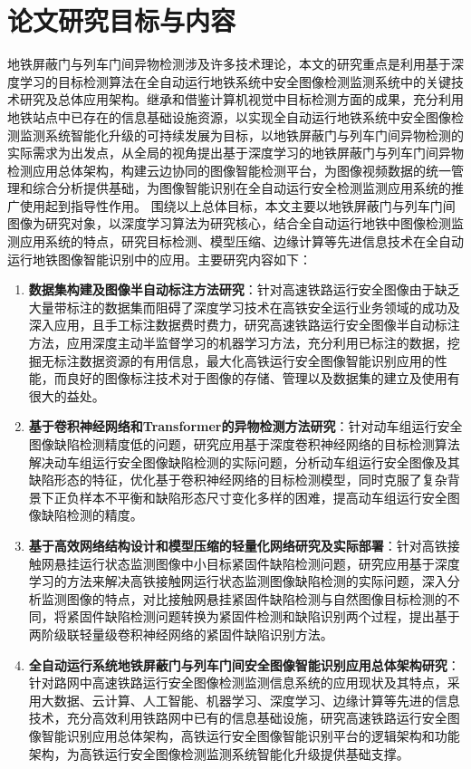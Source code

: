 \section{论文研究目标与内容}
地铁屏蔽门与列车门间异物检测涉及许多技术理论，本文的研究重点是利用基于深度学习的目标检测算法在全自动运行地铁系统中安全图像检测监测系统中的关键技术研究及总体应用架构。继承和借鉴计算机视觉中目标检测方面的成果，充分利用地铁站点中已存在的信息基础设施资源，以实现全自动运行地铁系统中安全图像检测监测系统智能化升级的可持续发展为目标，以地铁屏蔽门与列车门间异物检测的实际需求为出发点，从全局的视角提出基于深度学习的地铁屏蔽门与列车门间异物检测应用总体架构，构建云边协同的图像智能检测平台，为图像视频数据的统一管理和综合分析提供基础，为图像智能识别在全自动运行安全检测监测应用系统的推广使用起到指导性作用。 
围绕以上总体目标，本文主要以地铁屏蔽门与列车门间图像为研究对象，以深度学习算法为研究核心，结合全自动运行地铁中图像检测监测应用系统的特点，研究目标检测、模型压缩、边缘计算等先进信息技术在全自动运行地铁图像智能识别中的应用。主要研究内容如下： 
\begin{enumerate}[topsep = 0 pt, itemsep= 0 pt, parsep=0pt, partopsep=0pt, leftmargin=44pt, itemindent=0pt, labelsep=6pt, label=(\arabic*)]
	\item \textbf{数据集构建及图像半自动标注方法研究}：针对高速铁路运行安全图像由于缺乏大量带标注的数据集而阻碍了深度学习技术在高铁安全运行业务领域的成功及深入应用，且手工标注数据费时费力，研究高速铁路运行安全图像半自动标注方法，应用深度主动半监督学习的机器学习方法，充分利用已标注的数据，挖掘无标注数据资源的有用信息，最大化高铁运行安全图像智能识别应用的性能，而良好的图像标注技术对于图像的存储、管理以及数据集的建立及使用有很大的益处。
	
	
	\item \textbf{基于卷积神经网络和Transformer的异物检测方法研究}：针对动车组运行安全图像缺陷检测精度低的问题，研究应用基于深度卷积神经网络的目标检测算法解决动车组运行安全图像缺陷检测的实际问题，分析动车组运行安全图像及其缺陷形态的特征，优化基于卷积神经网络的目标检测模型，同时克服了复杂背景下正负样本不平衡和缺陷形态尺寸变化多样的困难，提高动车组运行安全图像缺陷检测的精度。
	
	
	\item \textbf{基于高效网络结构设计和模型压缩的轻量化网络研究及实际部署}：针对高铁接触网悬挂运行状态监测图像中小目标紧固件缺陷检测问题，研究应用基于深度学习的方法来解决高铁接触网运行状态监测图像缺陷检测的实际问题，深入分析监测图像的特点，对比接触网悬挂紧固件缺陷检测与自然图像目标检测的不同，将紧固件缺陷检测问题转换为紧固件检测和缺陷识别两个过程，提出基于两阶级联轻量级卷积神经网络的紧固件缺陷识别方法。 
	
	\item \textbf{全自动运行系统地铁屏蔽门与列车门间安全图像智能识别应用总体架构研究}：针对路网中高速铁路运行安全图像检测监测信息系统的应用现状及其特点，采用大数据、云计算、人工智能、机器学习、深度学习、边缘计算等先进的信息技术，充分高效利用铁路网中已有的信息基础设施，研究高速铁路运行安全图像智能识别应用总体架构，高铁运行安全图像智能识别平台的逻辑架构和功能架构，为高铁运行安全图像检测监测系统智能化升级提供基础支撑。  
\end{enumerate}
